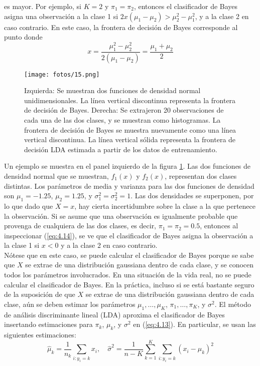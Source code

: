 es mayor. Por ejemplo, si $K = 2$ y $\pi_1 = \pi_2$, entonces el clasificador de Bayes asigna una observación a la clase 1 si $2x(\mu_1 - \mu_2) > \mu_2^2 - \mu_1^2$, y a la clase 2 en caso contrario. En este caso, la frontera de decisión de Bayes corresponde al punto donde
\begin{equation}
x = \frac{\mu_1^2 - \mu_2^2}{2(\mu_1 - \mu_2)} = \frac{\mu_1 + \mu_2}{2}
\label{eq:4.14}
\end{equation}

\begin{figure}[h]
\centering
\texttt{[image: fotos/15.png]}
\caption{Izquierda: Se muestran dos funciones de densidad normal unidimensionales. La línea vertical discontinua representa la frontera de decisión de Bayes. Derecha: Se extrajeron 20 observaciones de cada una de las dos clases, y se muestran como histogramas. La frontera de decisión de Bayes se muestra nuevamente como una línea vertical discontinua. La línea vertical sólida representa la frontera de decisión LDA estimada a partir de los datos de entrenamiento.}
\label{fig:4.4}
\end{figure}

Un ejemplo se muestra en el panel izquierdo de la figura \ref{fig:4.4}. Las dos funciones de densidad normal que se muestran, $f_1(x)$ y $f_2(x)$, representan dos clases distintas. Los parámetros de media y varianza para las dos funciones de densidad son $\mu_1 = -1.25$, $\mu_2 = 1.25$, y $\sigma^2_1 = \sigma^2_2 = 1$. Las dos densidades se superponen, por lo que dado que $X = x$, hay cierta incertidumbre sobre la clase a la que pertenece la observación. Si se asume que una observación es igualmente probable que provenga de cualquiera de las dos clases, es decir, $\pi_1 = \pi_2 = 0.5$, entonces al inspeccionar (\ref{eq:4.14}), se ve que el clasificador de Bayes asigna la observación a la clase 1 si $x < 0$ y a la clase 2 en caso contrario. \\

Nótese que en este caso, se puede calcular el clasificador de Bayes porque se sabe que $X$ se extrae de una distribución gaussiana dentro de cada clase, y se conocen todos los parámetros involucrados. En una situación de la vida real, no se puede calcular el clasificador de Bayes. En la práctica, incluso si se está bastante seguro de la suposición de que $X$ se extrae de una distribución gaussiana dentro de cada clase, aún se deben estimar los parámetros $\mu_1, \ldots, \mu_K$, $\pi_1, \ldots, \pi_K$, y $\sigma^2$. El método de análisis discriminante lineal (LDA) aproxima el clasificador de Bayes insertando estimaciones para $\pi_k$, $\mu_k$, y $\sigma^2$ en (\ref{eq:4.13}). En particular, se usan las siguientes estimaciones:
\begin{equation}
\hat{\mu}_k = \frac{1}{n_k} \sum_{i: y_i = k} x_i, \quad \hat{\sigma}^2 = \frac{1}{n - K} \sum_{k=1}^K \sum_{i: y_i = k} (x_i - \hat{\mu}_k)^2
\label{eq:4.15}
\end{equation}

